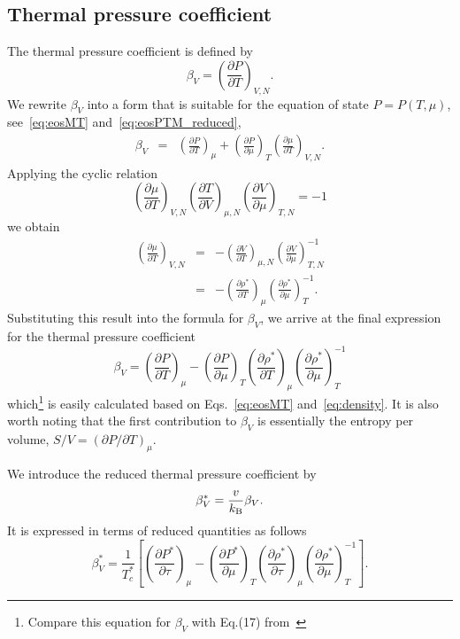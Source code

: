 \documentclass[fleqn,twoside,twocolumn,nofootinbib,showkeys]{revtex4} %
\begin{document}
	\subsection{Thermal pressure coefficient}
	The thermal pressure coefficient is defined by
	\begin{equation}
		\label{def:therm_pres_coef}
		\beta_V = \left( \frac{\partial P}{\partial T} \right)_{V,N}.
	\end{equation}
	We rewrite $\beta_V$ into a form that is suitable for the equation of state $P=P(T,\mu)$, see~\eqref{eq:eosMT} and~\eqref{eq:eosPTM_reduced},
	\begin{eqnarray}
		\beta_V	& = & \left(\frac{\partial P}{\partial T}\right)_{\mu} + \left(\frac{\partial P}{\partial \mu}\right)_T \left(\frac{\partial \mu}{\partial T}\right)_{V, N}.
	\end{eqnarray}
	Applying the cyclic relation
	\begin{equation*}
		\left(\frac{\partial \mu}{\partial T}\right)_{V, N} 
		\left(\frac{\partial T}{\partial V}\right)_{\mu, N}
		\left(\frac{\partial V}{\partial \mu}\right)_{T, N}
		= -1
	\end{equation*}
	we obtain
	\begin{eqnarray*}
		\left(\frac{\partial \mu}{\partial T}\right)_{V, N} 
		& = & 
		- \left(\frac{\partial V}{\partial T}\right)_{\mu, N} 
		\left(\frac{\partial V}{\partial \mu}\right)^{-1}_{T, N} \\
		& = & - \left(\frac{\partial \rho^*}{\partial T}\right)_{\mu}
		\left(\frac{\partial \rho^*}{\partial \mu}\right)^{-1}_{T}.		
	\end{eqnarray*}
	Substituting this result into the formula for $\beta_V$, we arrive at the final expression for the thermal pressure coefficient
	\begin{equation}
		\beta_V = \left(\frac{\partial P}{\partial T}\right)_{\mu} 
		- \left(\frac{\partial P}{\partial \mu}\right)_T 
		\left(\frac{\partial \rho^*}{\partial T}\right)_{\mu}
		\left(\frac{\partial \rho^*}{\partial \mu}\right)^{-1}_{T}
	\end{equation}
	which\footnote{Compare this equation for $\beta_V$ with Eq.(17) from~\cite{StrokerMeier2021}} is easily calculated based on Eqs.~\eqref{eq:eosMT} and~\eqref{eq:density}. It is also worth noting that the first contribution to $\beta_V$ is essentially the entropy per volume, $S/V = (\partial P / \partial T)_\mu$.
	
	We introduce the reduced thermal pressure coefficient by
	\begin{equation}
		\beta^*_V = \frac{v}{k_{\rm B}}\beta_V.
	\end{equation}
	It is expressed in terms of reduced quantities as follows
	\begin{equation}
		\label{eq:beta_star_m}
		\beta^*_V = \frac{1}{T^*_c} 
		\left[ \left(\frac{\partial P^*}{\partial \tau}\right)_{\mu} 
		- \left(\frac{\partial P^*}{\partial \mu}\right)_T 
		\left(\frac{\partial \rho^*}{\partial \tau}\right)_{\mu}
		\left(\frac{\partial \rho^*}{\partial \mu}\right)^{-1}_{T} 
		\right].
	\end{equation}
	
\end{document}
